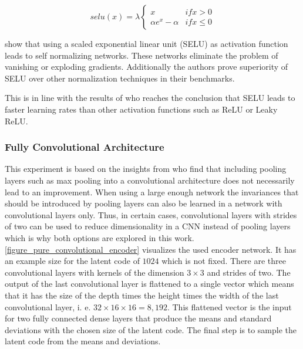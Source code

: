 \begin{equation}
    selu(x) = \lambda \begin{cases}
        x & if x > 0 \\
        \alpha e^x- \alpha & if x \leq 0
    \end{cases}
\end{equation}

\textcite{2017-klambauer-selu} show that using
a scaled exponential linear unit (SELU) as activation function leads to self normalizing networks. These networks 
eliminate the problem of vanishing or exploding gradients. Additionally the authors prove superiority of SELU 
over other normalization techniques in their benchmarks. 

This is in line with the results of \textcite{2018-Pedamonti-comparison} who reaches the conclusion that SELU leads
to faster learning rates than other activation functions such as ReLU or Leaky ReLU.\\

\subsubsection{Fully Convolutional Architecture} \label{section_pure_convolutional_architecture}


This experiment is based on the insights from \textcite{2015-springenberg-striving} who
find that including pooling layers such as max pooling into a convolutional architecture does not 
necessarily lead to an improvement. When using a large enough network the invariances that should be
introduced by pooling layers can also be learned in a network with convolutional layers only. Thus, in certain cases,
convolutional layers with strides of two can be used to reduce dimensionality in a CNN instead of pooling layers
which is why both options are explored in this work.
\autoref{figure_pure_convolutional_encoder} visualizes the used encoder network. It has an example size for the
latent code of $1024$ which is not fixed. There are three convolutional
layers with kernels of the dimension $3\times 3$ and strides of two. The output of the last convolutional layer
is flattened to a single vector which means that it has the size of the depth times the height times the width of
the last convolutional layer, i. e. $32\times16\times16 = 8,192$. This flattened vector is the input for two fully connected
dense layers that produce the means and standard deviations with the chosen size of the latent code. The final step
is to sample the latent code from the means and deviations.

